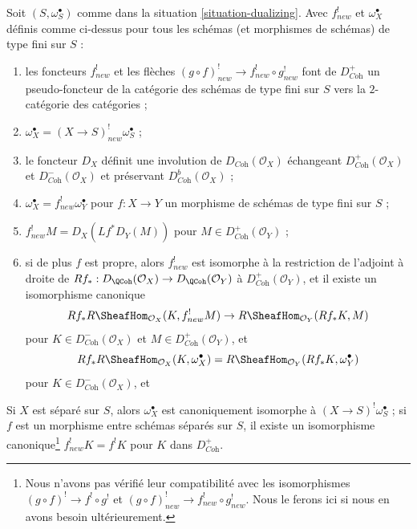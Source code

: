 \begin{lemma}
\label{lemma-duality-bootstrap}
Soit $(S, \omega_S^\bullet)$ comme dans la situation \ref{situation-dualizing}. Avec $f^!_{new}$ et $\omega_X^\bullet$ définis comme ci-dessus pour tous les schémas (et morphismes de schémas) de type fini sur $S$ :
\begin{enumerate}
\item les foncteurs $f^!_{new}$ et les flèches $(g \circ f)^!_{new} \to f^!_{new} \circ g^!_{new}$ font de $D_{\textit{Coh}}^+$ un pseudo-foncteur de la catégorie des schémas de type fini sur $S$ vers la $2$-catégorie des catégories ;
\item $\omega_X^\bullet = (X \to S)^!_{new} \omega_S^\bullet$ ;
\item le foncteur $D_X$ définit une involution de $D_{\textit{Coh}}(\mathcal{O}_X)$ échangeant $D_{\textit{Coh}}^+(\mathcal{O}_X)$ et $D_{\textit{Coh}}^-(\mathcal{O}_X)$ et préservant $D_{\textit{Coh}}^b(\mathcal{O}_X)$ ;
\item $\omega_X^\bullet = f^!_{new}\omega_Y^\bullet$ pour $f : X \to Y$ un morphisme de schémas de type fini sur $S$ ;
\item $f^!_{new}M = D_X(Lf^*D_Y(M))$ pour $M \in D_{\textit{Coh}}^+(\mathcal{O}_Y)$ ;
\item si de plus $f$ est propre, alors $f^!_{new}$ est isomorphe à la restriction de l'adjoint à droite de $Rf_* : D_\QCoh(\mathcal{O}_X) \to D_\QCoh(\mathcal{O}_Y)$ à $D_{\textit{Coh}}^+(\mathcal{O}_Y)$, et il existe un isomorphisme canonique
$$
Rf_*R\SheafHom_{\mathcal{O}_X}(K, f^!_{new}M)
\to
R\SheafHom_{\mathcal{O}_Y}(Rf_*K, M)
$$
pour $K \in D^-_{\textit{Coh}}(\mathcal{O}_X)$ et $M \in D_{\textit{Coh}}^+(\mathcal{O}_Y)$, et
$$
Rf_*R\SheafHom_{\mathcal{O}_X}(K, \omega_X^\bullet) =
R\SheafHom_{\mathcal{O}_Y}(Rf_*K, \omega_Y^\bullet)
$$
pour $K \in D^-_{\textit{Coh}}(\mathcal{O}_X)$, et
\end{enumerate}
\enlargethispage\smallskipamount
Si $X$ est séparé sur $S$, alors $\omega_X^\bullet$ est canoniquement isomorphe à $(X \to S)^!\omega_S^\bullet$ ; si $f$ est un morphisme entre schémas séparés sur $S$, il existe un isomorphisme canonique\footnote{Nous n'avons pas vérifié leur compatibilité avec les isomorphismes $(g \circ f)^! \to f^! \circ g^!$ et $(g \circ f)^!_{new} \to f^!_{new} \circ g^!_{new}$. Nous le ferons ici si nous en avons besoin ultérieurement.} $f_{new}^!K = f^!K$ pour $K$ dans $D_{\textit{Coh}}^+$.
\end{lemma}

